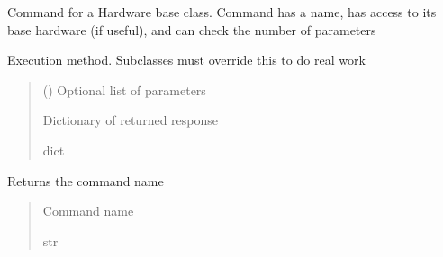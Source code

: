 \documentclass[letterpaper,10pt,english]{sphinxmanual}
\begin{document}
\begin{fulllineitems}
\label{\detokenize{webserverdocs:HardwareBaseClass.HardwareCommand}}
\pysigstartsignatures
{}
\pysigstopsignatures
\sphinxAtStartPar
Command for a Hardware base class. Command has a name, has access to
its base hardware (if useful), and can check the number of parameters

\begin{fulllineitems}
\label{\detokenize{webserverdocs:HardwareBaseClass.HardwareCommand.do}}
\pysigstartsignatures
{}
\pysigstopsignatures
\sphinxAtStartPar
Execution method. Subclasses must override this to do real work
\begin{quote}\begin{description}
\sphinxAtStartPar
{} () \textendash{} Optional list of parameters

\sphinxAtStartPar
Dictionary of returned response

\sphinxAtStartPar
dict

\end{description}\end{quote}

\end{fulllineitems}


\begin{fulllineitems}
\label{\detokenize{webserverdocs:HardwareBaseClass.HardwareCommand.name}}
\pysigstartsignatures
{}
\pysigstopsignatures
\sphinxAtStartPar
Returns the command name
\begin{quote}\begin{description}
\sphinxAtStartPar
Command name

\sphinxAtStartPar
str

\end{description}\end{quote}

\end{fulllineitems}


\end{fulllineitems}
\end{document}

